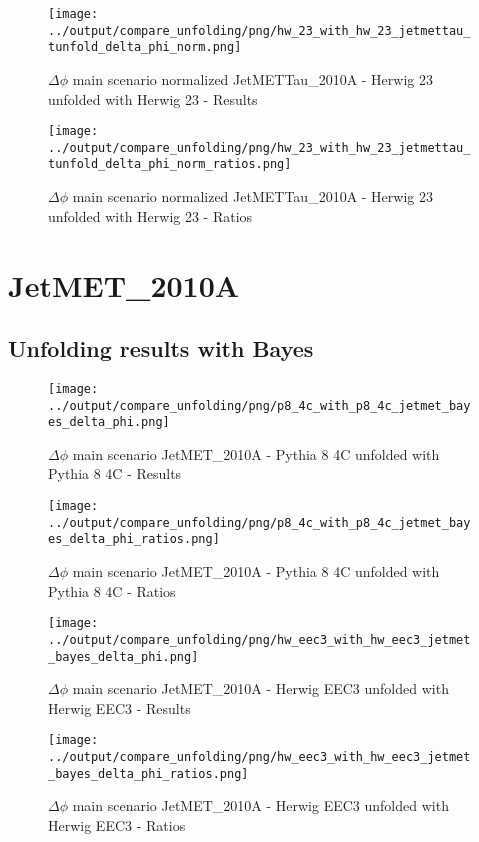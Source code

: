 \documentclass[11pt]{book}
\begin{document}
\begin{figure}[ht]
\centering
\texttt{[image: ../output/compare\_unfolding/png/hw\_23\_with\_hw\_23\_jetmettau\_tunfold\_delta\_phi\_norm.png]}
\caption{$\Delta\phi$ main scenario normalized JetMETTau\_2010A - Herwig 23 unfolded with Herwig 23 - Results}
\label{hw_23_hw_23_jetmettau_tunfold_delta_phi_norm_a}
\end{figure}

\begin{figure}[ht]
\centering
\texttt{[image: ../output/compare\_unfolding/png/hw\_23\_with\_hw\_23\_jetmettau\_tunfold\_delta\_phi\_norm\_ratios.png]}
\caption{$\Delta\phi$ main scenario normalized JetMETTau\_2010A - Herwig 23 unfolded with Herwig 23 - Ratios}
\label{hw_23_jetmettau_tunfold_delta_phi_norm_b}
\end{figure}


\clearpage
\section{JetMET\_2010A}
\subsection{Unfolding results with Bayes}

\begin{figure}[ht]
\centering
\texttt{[image: ../output/compare\_unfolding/png/p8\_4c\_with\_p8\_4c\_jetmet\_bayes\_delta\_phi.png]}
\caption{$\Delta\phi$ main scenario JetMET\_2010A - Pythia 8 4C unfolded with Pythia 8 4C - Results}
\label{p8_p8_jetmet_delta_phi_a}
\end{figure}

\begin{figure}[ht]
\centering
\texttt{[image: ../output/compare\_unfolding/png/p8\_4c\_with\_p8\_4c\_jetmet\_bayes\_delta\_phi\_ratios.png]}
\caption{$\Delta\phi$ main scenario JetMET\_2010A - Pythia 8 4C unfolded with Pythia 8 4C - Ratios}
\label{p8_p8_jetmet_delta_phi_b}
\end{figure}

\begin{figure}[ht]
\centering
\texttt{[image: ../output/compare\_unfolding/png/hw\_eec3\_with\_hw\_eec3\_jetmet\_bayes\_delta\_phi.png]}
\caption{$\Delta\phi$ main scenario JetMET\_2010A - Herwig EEC3 unfolded with Herwig EEC3 - Results}
\label{hw_eec3_hw_eec3_jetmet_delta_phi_a}
\end{figure}

\begin{figure}[ht]
\centering
\texttt{[image: ../output/compare\_unfolding/png/hw\_eec3\_with\_hw\_eec3\_jetmet\_bayes\_delta\_phi\_ratios.png]}
\caption{$\Delta\phi$ main scenario JetMET\_2010A - Herwig EEC3 unfolded with Herwig EEC3 - Ratios}
\label{hw_eec3_jetmet_delta_phi_b}
\end{figure}
\end{document}
